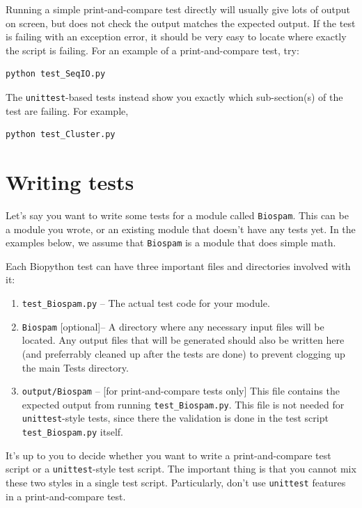 \documentclass{report}
\begin{document}
Running a simple print-and-compare test directly will usually give lots
of output on screen, but does not check the output matches the expected
output.  If the test is failing with an exception error, it should be
very easy to locate where exactly the script is failing.
For an example of a print-and-compare test, try:
\begin{verbatim}
python test_SeqIO.py
\end{verbatim}

The \verb|unittest|-based tests instead show you exactly which sub-section(s) of
the test are failing. For example,
\begin{verbatim}
python test_Cluster.py
\end{verbatim}

\section{Writing tests}

Let's say you want to write some tests for a module called \verb|Biospam|.
This can be a module you wrote, or an existing module that doesn't have
any tests yet.  In the examples below, we assume that
\verb|Biospam| is a module that does simple math.

Each Biopython test can have three important files and directories involved with it:

\begin{enumerate}
  \item \verb|test_Biospam.py| -- The actual test code for your module.
  \item \verb|Biospam| [optional]-- A directory where any necessary input files
    will be located. Any output files that will be generated should also
    be written here (and preferrably cleaned up after the tests are
    done) to prevent clogging up the main Tests directory.
  \item \verb|output/Biospam| -- [for print-and-compare tests only] This
    file contains the expected output from running \verb|test_Biospam.py|.
    This file is not needed for \verb|unittest|-style tests, since there
    the validation is done in the test script \verb|test_Biospam.py| itself.
\end{enumerate}

It's up to you to decide whether you want to write a print-and-compare test script or a \verb|unittest|-style test script. The important thing is that you cannot mix these two styles in a single test script. Particularly, don't use \verb|unittest| features in a print-and-compare test.
\end{document}
